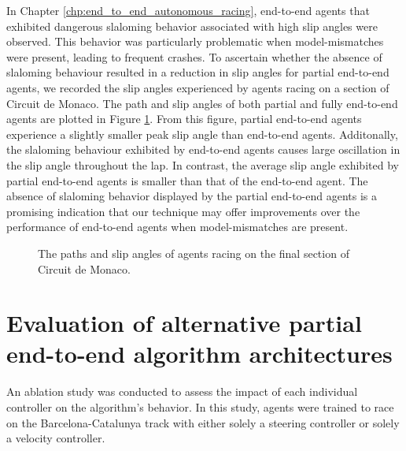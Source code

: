 In Chapter \ref{chp:end_to_end_autonomous_racing}, end-to-end agents that exhibited dangerous slaloming behavior associated with high slip angles were observed. 
This behavior was particularly problematic when model-mismatches were present, leading to frequent crashes.
To ascertain whether the absence of slaloming behaviour resulted in a reduction in slip angles for partial end-to-end agents, we recorded
the slip angles experienced by agents racing on a section of Circuit de Monaco.
The path and slip angles of both partial and fully end-to-end agents are plotted in Figure \ref{fig:pete:slip}.
From this figure, partial end-to-end agents experience a slightly smaller peak slip angle than end-to-end agents.
Additonally, the slaloming behaviour exhibited by end-to-end agents causes large oscillation in the slip angle throughout the lap.
In contrast, the average slip angle exhibited by partial end-to-end agents is smaller than that of the end-to-end agent.
The absence of slaloming behavior displayed by the partial end-to-end agents is a promising indication that our technique may offer improvements over the performance of end-to-end agents  when model-mismatches are present. 

\begin{figure}[htb!]
    \centering
    
    \caption[Paths and slip angles of agents racing on Circuit de Monaco]{The paths and slip angles of agents racing on the final section of Circuit de Monaco.}
    \label{fig:pete:slip}
\end{figure}






\section{Evaluation of alternative partial end-to-end algorithm architectures}

An ablation study was conducted to assess the impact of each individual controller on the algorithm's behavior. 
In this study, agents were trained to race on the Barcelona-Catalunya track with either solely a steering controller or solely a velocity controller.

